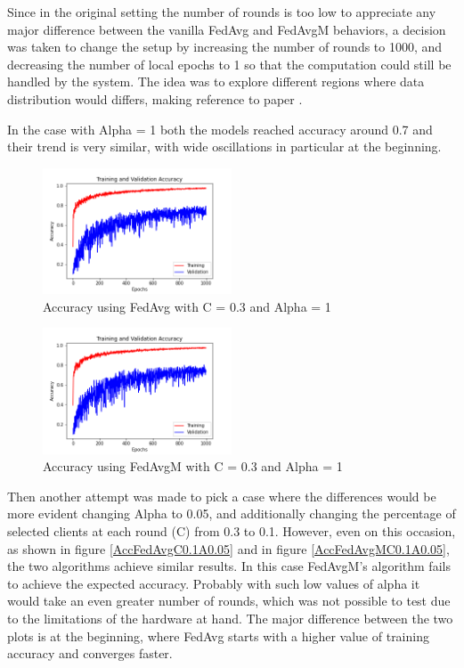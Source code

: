 \documentclass[twocolumn]{article}
\begin{document}
Since in the original setting the number of rounds is too low to appreciate any major difference between the vanilla FedAvg and FedAvgM behaviors, a decision was taken to change the setup by increasing the number of rounds to 1000, and decreasing the number of local epochs to 1 so that the computation could still be handled by the system.
The idea was to explore different regions where data distribution would differs, making reference to paper \cite{DBLP:journals/corr/KonecnyMYRSB16}.


In the case with Alpha = 1 both the models reached accuracy around 0.7 and their trend is very similar, with wide oscillations in particular at the beginning.

\begin{figure}
    \centering
    \includegraphics[width=0.5\textwidth,height=.3\textheight]{9_AccuracyFedAvg_C0.3A_1.png}
    \caption{Accuracy using FedAvg with C = 0.3 and Alpha = 1}
     \label{AccFedAvgC0.3A1} 
\end{figure}

\begin{figure}
    \centering
    \includegraphics[width=0.5\textwidth,height=.3\textheight]{9_AccuracyFedAvgM_C0.3A_1.png}
    \caption{Accuracy using FedAvgM with C = 0.3 and Alpha = 1}
     \label{AccFedAvgMC0.3A1} 
\end{figure}

Then another attempt was made to pick a case where the differences would be more evident changing Alpha to 0.05, and additionally changing the percentage of selected clients at each round (C) from 0.3 to 0.1. 
However, even on this occasion, as shown in figure \ref{AccFedAvgC0.1A0.05} and in figure \ref{AccFedAvgMC0.1A0.05}, the two algorithms achieve similar results. In this case FedAvgM's algorithm fails to achieve the expected accuracy. Probably with such low values of alpha it would take an even greater number of rounds, which was not possible to test due to the limitations of the hardware at hand. The major difference between the two plots is at the beginning, where FedAvg starts with a higher value of training accuracy and converges faster.
\end{document}

